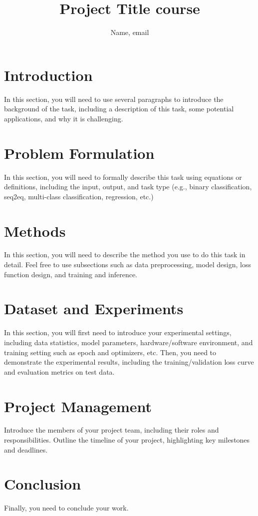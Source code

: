 \documentclass{article}
\title{Project Title  course }
\author{%
   Name, email\\
}
\begin{document}
\maketitle

\section{Introduction}
In this section, you will need to use several paragraphs to introduce the background of the task, including a description of this task, some potential applications, and why it is challenging. 

\section{Problem Formulation}
In this section, you will need to formally describe this task using equations or definitions, including the input, output, and task type (e.g., binary classification, seq2eq, multi-class classification, regression, etc.)

\section{Methods}
In this section, you will need to describe the method you use to do this task in detail. Feel free to use subsections such as data preprocessing, model design, loss function design, and training and inference.

\section{Dataset and Experiments}
In this section, you will first need to introduce your experimental settings, including data statistics, model parameters, hardware/software environment, and training setting such as epoch and optimizers, etc.
Then, you need to demonstrate the experimental results, including the training/validation loss curve and evaluation metrics on test data.

\section{Project Management}
Introduce the members of your project team, including their roles and responsibilities. Outline the timeline of your project, highlighting key milestones and deadlines. 

\section{Conclusion}
Finally, you need to conclude your work.
\end{document}
